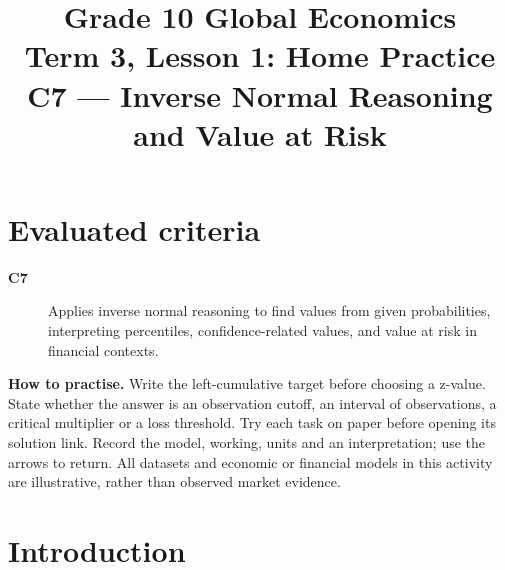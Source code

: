 \makeatletter
{}
\makeatother




\title{Grade 10 Global Economics\\Term 3, Lesson 1: Home Practice\\C7 --- Inverse Normal Reasoning and Value at Risk}
\author{}
\date{}

\maketitle
\setcounter{tocdepth}{1}
\setcounter{secnumdepth}{2}
\label{toc}
\tableofcontents
\section*{Evaluated criteria}
\begin{description}
\item[\textbf{C7}] Applies inverse normal reasoning to find values from given probabilities, interpreting percentiles, confidence-related values, and value at risk in financial contexts.
\end{description}
\textbf{How to practise.} Write the left-cumulative target before choosing a z-value. State whether the answer is an observation cutoff, an interval of observations, a critical multiplier or a loss threshold. Try each task on paper before opening its solution link. Record the model, working, units and an interpretation; use the arrows to return.
All datasets and economic or financial models in this activity are illustrative, rather than observed market evidence.

\clearpage
\section{Introduction}\label{sec:introduction}
